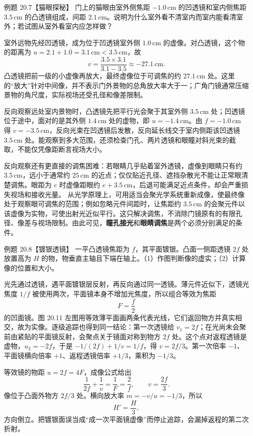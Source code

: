 \begin{origexamplebox}{例题 20.7【猫眼探秘】}
门上的猫眼由室外侧焦距 $-1.0\,\mathrm{cm}$ 的凹透镜和室内侧焦距 $3.5\,\mathrm{cm}$ 的凸透镜组成，间距 $2.1\,\mathrm{cm}$。说明为什么室外看不清室内而室内能看清室外；若试图从室外看室内应怎样做？
\end{origexamplebox}
\begin{xesolution}
室外远物先经凹透镜，成为位于凹透镜室外侧 $1.0\,\mathrm{cm}$ 的虚像。对凸透镜，这个物的距离为 $u=2.1+1.0=3.1\,\mathrm{cm}<3.5\,\mathrm{cm}$，故
\[
 v=\frac{3.5\times3.1}{3.1-3.5}\approx-27.1\,\mathrm{cm}.
\]
凸透镜把前一级的小虚像再放大，最终虚像位于可调焦的约 $27.1\,\mathrm{cm}$ 处。这里的“放大”针对中间像，并不表示门外景物的总角放大率大于一；广角门镜通常压缩景物的角尺度，实际视场还受孔径和像差限制。

反向观察远处室内景物时，凸透镜先把平行光会聚于其室外侧 $3.5\,\mathrm{cm}$ 处；凹透镜位于途中，面对的是其外侧 $1.4\,\mathrm{cm}$ 处的虚物，即 $u=-1.4\,\mathrm{cm}$。由 $f=-1.0\,\mathrm{cm}$ 得 $v=-3.5\,\mathrm{cm}$，反向光束在凹透镜后发散，反向延长线交于室内侧距该凹透镜 $3.5\,\mathrm{cm}$ 处。能观察到多大范围，还须检查门孔、两片透镜和眼瞳对斜光束的截取，不能仅凭像距断言视场大小。

反向观察还有更直接的调焦困难：若眼睛几乎贴着室外透镜，虚像到眼睛只有约 $3.5\,\mathrm{cm}$，远小于通常约 $25\,\mathrm{cm}$ 的近点；仅仅贴近孔径、遮挡杂散光不能让正常眼清楚调焦。眼距为 $e$ 时虚像距眼约 $e+3.5\,\mathrm{cm}$，后退可能满足近点条件，却会严重损失视场和接收光量。
从光学原理上，可用适当会聚光学系统重新成像，使最终像处于观察眼可调焦的范围；例如忽略元件间距时，让焦距约 $3.5\,\mathrm{cm}$ 的会聚元件以该虚像为实物，可使出射光近似平行。这只解决调焦，不消除门镜原有的有限孔径、像差与视场限制。由此可见，\textbf{瞳孔接光}和\textbf{眼睛调焦}是两个必须分别满足的条件。
\end{xesolution}

\SilveredAndTrainPanel

\begin{origexamplebox}{例题 20.8【镀银透镜】}
一平凸透镜焦距为 $f$，其平面镀银。凸面一侧距透镜 $2f$ 处放置高为 $H$ 的物，物垂直主轴且下端在轴上。（1）作图判断像的虚实；（2）计算像的位置和大小。
\end{origexamplebox}
\begin{xesolution}
光先通过透镜，遇平面镀银层反射，再反向通过同一透镜。薄元件近似下，透镜光焦度 $1/f$ 被使用两次，平面镜本身不增加光焦度，所以组合等效为焦距
\[
 F=\frac f2
\]
的凹面镜。图 20.11 左图用等效薄平面画两条代表光线，它们返回物方并真实相交，故为实像。逐级追踪也得到同一结论：第一次透镜给 $v_1=2f$；在光尚未会聚前由紧贴的平面镜反射，会聚点关于镜面对称到物方 $2f$ 处。这个点对返程透镜是虚物，$u_2=-2f$，于是 $-1/(2f)+1/v=1/f$，得 $v=2f/3$。第一次倍率 $-1$、平面镜横向倍率 $+1$、返程透镜倍率 $+1/3$，乘积为 $-1/3$。

等效镜的物距 $u=2f=4F$，成像公式给出
\[
 \frac1{2f}+\frac1v=\frac1F=\frac2f,\qquad
 \boxed{v=\frac{2f}{3}}.
\]
像位于凸面外物方 $2f/3$ 处。横向放大率 $m=-v/u=-1/3$，所以
\[
 \boxed{H'=\frac H3},
\]
方向倒立。把镀银面误当成“成一次平面镜虚像”而停止追踪，会漏掉返程的第二次折射。
\end{xesolution}

